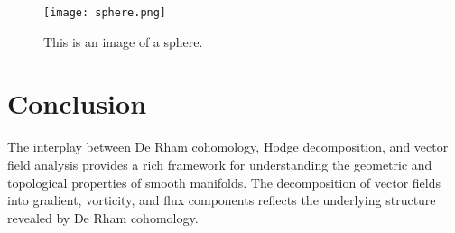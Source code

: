 \documentclass[12pt]{article}
\begin{document}
\begin{figure}[ht]
    \centering
    \texttt{[image: sphere.png]}
    \caption{This is an image of a sphere.}
\end{figure}


\section{Conclusion}
The interplay between De Rham cohomology, Hodge decomposition, and vector field analysis provides a rich framework for understanding the geometric and topological properties of smooth manifolds. The decomposition of vector fields into gradient, vorticity, and flux components reflects the underlying structure revealed by De Rham cohomology.
\end{document}
